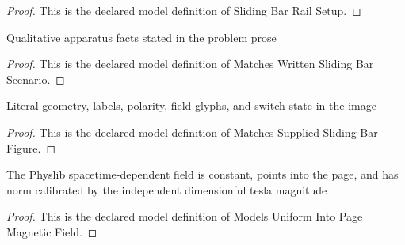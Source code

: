 \begin{proof}
  This is the declared model definition of Sliding Bar Rail Setup.
\end{proof}
\begin{definition}
  \label{def:physics:phyx-mini-0976:phyxminiproblems-problemphyxmini0976-matcheswrittenslidingbarscenario}
  Qualitative apparatus facts stated in the problem prose
\end{definition}
\begin{proof}
  This is the declared model definition of Matches Written Sliding Bar Scenario.
\end{proof}
\begin{definition}
  \label{def:physics:phyx-mini-0976:phyxminiproblems-problemphyxmini0976-matchessuppliedslidingbarfigure}
  Literal geometry, labels, polarity, field glyphs, and switch state in the image
\end{definition}
\begin{proof}
  This is the declared model definition of Matches Supplied Sliding Bar Figure.
\end{proof}
\begin{definition}
  \label{def:physics:phyx-mini-0976:phyxminiproblems-problemphyxmini0976-modelsuniformintopagemagneticfield}
  The Physlib spacetime-dependent field is constant, points into the page, and has norm calibrated by the independent dimensionful tesla magnitude
\end{definition}
\begin{proof}
  This is the declared model definition of Models Uniform Into Page Magnetic Field.
\end{proof}
